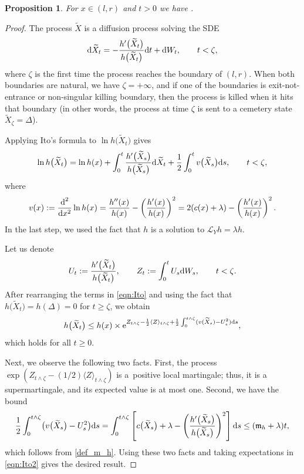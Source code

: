 \documentclass[10pt,a4paper]{amsart}
\numberwithin{equation}{section}
\newtheorem{Proposition}[Theorem]{Proposition}
\theoremstyle{definition}
\def\L{{\mathcal L}}
\def\e{{\mathbb E}}
\def\d{{\textnormal d}}
\begin{document}
\begin{Proposition}\label{prop_excessive}
For $x\in (l,r)$ and $t>0$ we have \smash{$\e_x\big[ h\bigl(\widetilde X_t\bigr)\big] \le {\rm e}^{ ({\mathfrak m}_h + \lambda) t} h(x) $}.
\end{Proposition}
\begin{proof}
The process $\widetilde X$ is a diffusion process solving the SDE
\[
\d \widetilde X_t=-\frac{h'\bigl(\widetilde X_t\bigr)}{h\bigl(\widetilde X_t\bigr)} \d t + \d W_t, \qquad t<\zeta,
\]
where $\zeta$ is the first time the process reaches the boundary of $(l,r)$. When both boundaries are natural, we have $\zeta=+\infty$, and if one of the boundaries is exit-not-entrance or non-singular killing boundary, then the process is killed when it hits that boundary \big(in other words, the process at time $\zeta$ is sent to a cemetery state $\widetilde X_{\zeta}=\Delta$\big).

Applying Ito's formula to $\ln h\bigl(\widetilde X_t\bigr)$ gives
\begin{equation}\label{eqn:Ito}
\ln h\bigl(\widetilde X_t\bigr)=\ln h (x) +
\int_0^t \frac{h'\bigl(\widetilde X_s\bigr)}{h\bigl(\widetilde X_s\bigr)} \d \widetilde X_t
+\frac{1}{2} \int_0^t v\bigl(\widetilde X_s\bigr) \d s, \qquad t<\zeta,
\end{equation}
where
\[
v(x):=\frac{\d^2}{\d x^2} \ln h(x)=\frac{h''(x)}{h(x)}-\left(\frac{h'(x)}{h(x)}\right)^2=2(c(x)+\lambda)-\left(\frac{h'(x)}{h(x)}\right)^2.
\]
In the last step, we used the fact that $h$ is a solution to $\L_Y h=\lambda h$.

Let us denote
\[
U_t:=\frac{h'\bigl(\widetilde X_t\bigr)}{h\bigl(\widetilde X_t\bigr)}, \qquad Z_t:=\int_0^{t} U_s  \d W_s, \qquad t<\zeta.
\]
After rearranging the terms in \eqref{eqn:Ito} and using the fact that $h\bigl(\widetilde X_{t}\bigr)=h(\Delta)=0$ for $t\ge \zeta$, we obtain
\begin{equation}\label{eqn:Ito2}
h\bigl(\widetilde X_t\bigr) \le h(x) \times {\rm e}^{ Z_{t\wedge \zeta} - \frac{1}{2} \langle Z \rangle_{t\wedge \zeta} + \frac{1}{2} \int_0^{t\wedge \zeta} (v(\widetilde X_s) - U_s^2)\d s},
\end{equation}
which holds for all $t\ge 0$.

Next, we observe the following two facts. First, the process $\exp( Z_{t\wedge \zeta} - (1/2)\langle Z \rangle_{t\wedge \zeta})$ is a~positive local martingale; thus, it is a supermartingale, and its expected value is at most one. Second, we have the bound
\[
\frac{1}{2} \int_0^{t\wedge \zeta} \bigl(v\bigl(\widetilde X_s\bigr) - U_s^2\bigr) \d s =
\int_0^{t\wedge \zeta} \left[ c\bigl(\widetilde X_s\bigr) + \lambda - \left( \frac{h'\bigl(\widetilde X_s\bigr)}{h\bigl(\widetilde X_s\bigr)}\right)^2 \right] \d s \le ({\mathfrak m}_h+\lambda) t,
\]
which follows from \eqref{def_m_h}. Using these two facts and taking expectations in \eqref{eqn:Ito2} gives the desired result.
\end{proof}
\end{document}
